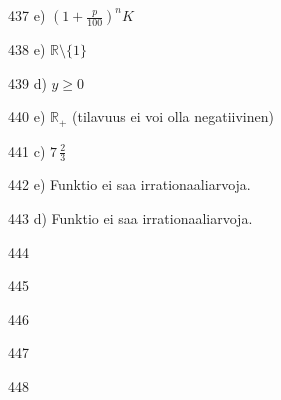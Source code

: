 \begin{Vastaus}{437}
e) $(1+\frac{p}{100})^nK$
	
\end{Vastaus}
\begin{Vastaus}{438}
	 e) $\mathbb{R}\setminus \lbrace 1 \rbrace$
    
\end{Vastaus}
\begin{Vastaus}{439}
	 d) $y\geq 0$
    
\end{Vastaus}
\begin{Vastaus}{440}
	e) $\mathbb{R}_+$ (tilavuus ei voi olla negatiivinen)
	
\end{Vastaus}
\begin{Vastaus}{441}
	c) $7\,\frac{2}{3}$
	
\end{Vastaus}
\begin{Vastaus}{442}
	e) Funktio ei saa irrationaaliarvoja.
	
\end{Vastaus}
\begin{Vastaus}{443}
	d) Funktio ei saa irrationaaliarvoja.
	
\end{Vastaus}
\begin{Vastaus}{444}
	
\end{Vastaus}
\begin{Vastaus}{445}
	
\end{Vastaus}
\begin{Vastaus}{446}
	
\end{Vastaus}
\begin{Vastaus}{447}
	
\end{Vastaus}
\begin{Vastaus}{448}
	
\end{Vastaus}
